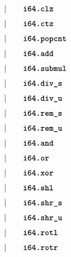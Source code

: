 \begin{alignat*}{9}
    &&       &&\quad | &\quad && \textbf{\texttt{i64.clz}} \quad &&  \\[1mm]
    &&       &&\quad | &\quad && \textbf{\texttt{i64.ctz}} \quad &&  \\[1mm]
    &&       &&\quad | &\quad && \textbf{\texttt{i64.popcnt}} \quad &&  \\[1mm]
    &&       &&\quad | &\quad && \textbf{\texttt{i64.add}} \quad &&  \\[1mm]
    &&       &&\quad | &\quad && \textbf{\texttt{i64.submul}} \quad &&  \\[1mm]
    &&       &&\quad | &\quad && \textbf{\texttt{i64.div\textunderscore s}} \quad &&  \\[1mm]
    &&       &&\quad | &\quad && \textbf{\texttt{i64.div\textunderscore u}} \quad &&  \\[1mm]
    &&       &&\quad | &\quad && \textbf{\texttt{i64.rem\textunderscore s}} \quad &&  \\[1mm]
    &&       &&\quad | &\quad && \textbf{\texttt{i64.rem\textunderscore u}} \quad &&  \\[1mm]
    &&       &&\quad | &\quad && \textbf{\texttt{i64.and}} \quad &&  \\[1mm]
    &&       &&\quad | &\quad && \textbf{\texttt{i64.or}} \quad &&  \\[1mm]
    &&       &&\quad | &\quad && \textbf{\texttt{i64.xor}} \quad &&  \\[1mm]
    &&       &&\quad | &\quad && \textbf{\texttt{i64.shl}} \quad &&  \\[1mm]
    &&       &&\quad | &\quad && \textbf{\texttt{i64.shr\textunderscore s}} \quad &&  \\[1mm]
    &&       &&\quad | &\quad && \textbf{\texttt{i64.shr\textunderscore u}} \quad &&  \\[1mm]
    &&       &&\quad | &\quad && \textbf{\texttt{i64.rotl}} \quad &&  \\[1mm]
    &&       &&\quad | &\quad && \textbf{\texttt{i64.rotr}} \quad &&  \\[1mm]
\end{alignat*}

